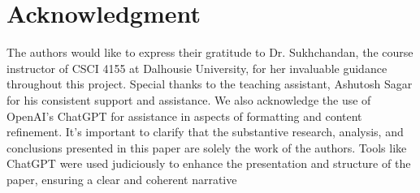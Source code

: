 \documentclass[conference]{IEEEtran}
\begin{document}
\section*{Acknowledgment}

The authors would like to express their gratitude to Dr. Sukhchandan, the course instructor of CSCI 4155 at Dalhousie University, for her invaluable guidance throughout this project. Special thanks to the teaching assistant, Ashutosh Sagar for his consistent support and assistance. We also acknowledge the use of OpenAI's ChatGPT for assistance in aspects of formatting and content refinement. It's important to clarify that the substantive research, analysis, and conclusions presented in this paper are solely the work of the authors. Tools like ChatGPT were used judiciously to enhance the presentation and structure of the paper, ensuring a clear and coherent narrative
\end{document}
